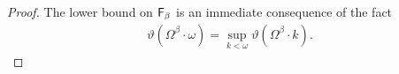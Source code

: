 \documentclass[UKenglish,cleveref,DIV=12]{scrartcl}
\theoremstyle{definition}
\theoremstyle{definition}
\begin{document}
\begin{proof}
The lower bound on $\mathsf{F}_\beta$ is an immediate consequence of the fact
\begin{align*}
  \vartheta(\Omega^{\beta}\cdot \omega)=\sup_{k<\omega}\vartheta(\Omega^{\beta}\cdot k).
\end{align*}
%
%
%
\end{proof}
\end{document}
